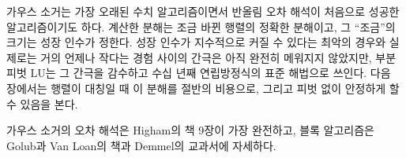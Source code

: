 가우스 소거는 가장 오래된 수치 알고리즘이면서 반올림 오차 해석이 처음으로 성공한 알고리즘이기도 하다. 계산한 분해는 조금 바뀐 행렬의 정확한 분해이고, 그 ``조금''의 크기는 성장 인수가 정한다. 성장 인수가 지수적으로 커질 수 있다는 최악의 경우와 실제로는 거의 언제나 작다는 경험 사이의 간극은 아직 완전히 메워지지 않았지만, 부분 피벗 LU는 그 간극을 감수하고 수십 년째 연립방정식의 표준 해법으로 쓰인다. 다음 장에서는 행렬이 대칭일 때 이 분해를 절반의 비용으로, 그리고 피벗 없이 안정하게 할 수 있음을 본다.

가우스 소거의 오차 해석은 Higham의 책\cite{higham2002accuracy} 9장이 가장 완전하고, 블록 알고리즘은 Golub과 Van Loan의 책\cite{golub2013matrix}과 Demmel의 교과서\cite{demmel1997}에 자세하다.

\chapterreferences
